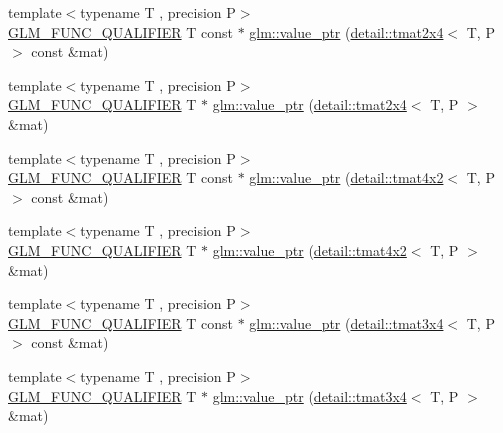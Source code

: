 \begin{DoxyCompactItemize}
\item 
{\footnotesize template$<$typename T , precision P$>$ }\\\hyperlink{setup_8hpp_a33fdea6f91c5f834105f7415e2a64407}{G\+L\+M\+\_\+\+F\+U\+N\+C\+\_\+\+Q\+U\+A\+L\+I\+F\+I\+ER} T const  $\ast$ \hyperlink{group__gtc__type__ptr_ga7b738eac576043c00c39bda2fc515d7b}{glm\+::value\+\_\+ptr} (\hyperlink{structglm_1_1detail_1_1tmat2x4}{detail\+::tmat2x4}$<$ T, P $>$ const \&mat)
\item 
{\footnotesize template$<$typename T , precision P$>$ }\\\hyperlink{setup_8hpp_a33fdea6f91c5f834105f7415e2a64407}{G\+L\+M\+\_\+\+F\+U\+N\+C\+\_\+\+Q\+U\+A\+L\+I\+F\+I\+ER} T $\ast$ \hyperlink{group__gtc__type__ptr_ga59b17271f4f487e556383b715f9b8534}{glm\+::value\+\_\+ptr} (\hyperlink{structglm_1_1detail_1_1tmat2x4}{detail\+::tmat2x4}$<$ T, P $>$ \&mat)
\item 
{\footnotesize template$<$typename T , precision P$>$ }\\\hyperlink{setup_8hpp_a33fdea6f91c5f834105f7415e2a64407}{G\+L\+M\+\_\+\+F\+U\+N\+C\+\_\+\+Q\+U\+A\+L\+I\+F\+I\+ER} T const  $\ast$ \hyperlink{group__gtc__type__ptr_ga73acc0dbfeeb9e6c09df1f79fd990b84}{glm\+::value\+\_\+ptr} (\hyperlink{structglm_1_1detail_1_1tmat4x2}{detail\+::tmat4x2}$<$ T, P $>$ const \&mat)
\item 
{\footnotesize template$<$typename T , precision P$>$ }\\\hyperlink{setup_8hpp_a33fdea6f91c5f834105f7415e2a64407}{G\+L\+M\+\_\+\+F\+U\+N\+C\+\_\+\+Q\+U\+A\+L\+I\+F\+I\+ER} T $\ast$ \hyperlink{group__gtc__type__ptr_ga478c7dc470b36836ac5392e852fd2348}{glm\+::value\+\_\+ptr} (\hyperlink{structglm_1_1detail_1_1tmat4x2}{detail\+::tmat4x2}$<$ T, P $>$ \&mat)
\item 
{\footnotesize template$<$typename T , precision P$>$ }\\\hyperlink{setup_8hpp_a33fdea6f91c5f834105f7415e2a64407}{G\+L\+M\+\_\+\+F\+U\+N\+C\+\_\+\+Q\+U\+A\+L\+I\+F\+I\+ER} T const  $\ast$ \hyperlink{group__gtc__type__ptr_ga233effe326542ae9657b8feac80e541f}{glm\+::value\+\_\+ptr} (\hyperlink{structglm_1_1detail_1_1tmat3x4}{detail\+::tmat3x4}$<$ T, P $>$ const \&mat)
\item 
{\footnotesize template$<$typename T , precision P$>$ }\\\hyperlink{setup_8hpp_a33fdea6f91c5f834105f7415e2a64407}{G\+L\+M\+\_\+\+F\+U\+N\+C\+\_\+\+Q\+U\+A\+L\+I\+F\+I\+ER} T $\ast$ \hyperlink{group__gtc__type__ptr_gad8c6b1dbda2b48d19fd1bc8b01cf701c}{glm\+::value\+\_\+ptr} (\hyperlink{structglm_1_1detail_1_1tmat3x4}{detail\+::tmat3x4}$<$ T, P $>$ \&mat)

\end{DoxyCompactItemize}
